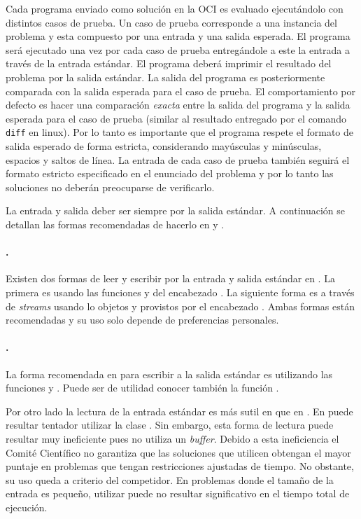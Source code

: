 Cada programa enviado como solución en la OCI es evaluado ejecutándolo con
distintos casos de prueba.
Un caso de prueba corresponde a una instancia del problema y esta compuesto por
una entrada y una salida esperada.
El programa será ejecutado una vez por cada caso de prueba entregándole a este
la entrada a través de la entrada estándar.
El programa deberá imprimir el resultado del problema por la salida estándar.
La salida del programa es posteriormente comparada con la salida esperada para
el caso de prueba.
El comportamiento por defecto es hacer una comparación \textit{exacta} entre la
salida del programa y la salida esperada para el caso de prueba (similar al
resultado entregado por el comando \verb|diff| en linux).
Por lo tanto es importante que el programa respete el formato de salida esperado
de forma estricta, considerando mayúsculas y minúsculas, espacios y saltos de
línea.
La entrada de cada caso de prueba también seguirá el formato estricto
especificado en el enunciado del problema y por lo tanto las soluciones no
deberán preocuparse de verificarlo.

La entrada y salida deber ser siempre por la salida estándar.
A continuación se detallan las formas recomendadas de hacerlo en \java y \cpp.
\paragraph{\cpp.} Existen dos formas de leer y escribir por la entrada y salida
  estándar en \cpp.
  La primera es usando las funciones  y  del encabezado
  .
  La siguiente forma es a través de \textit{streams} usando lo objetos
   y  provistos por el encabezado .
  Ambas formas están recomendadas y su uso solo depende de preferencias personales.
\paragraph{\java.} La forma recomendada en \java para escribir a la salida estándar es
  utilizando las funciones  y .
  Puede ser de utilidad conocer también la función .

  Por otro lado la lectura de la entrada estándar es más sutil en \java que en
  \cpp.
  En \java puede resultar tentador utilizar la clase .
  Sin embargo, esta forma de lectura puede resultar muy ineficiente pues no
  utiliza un \textit{buffer}.
  Debido a esta ineficiencia el Comité Científico no garantiza que las
  soluciones que utilicen  obtengan el mayor puntaje en problemas
  que tengan restricciones ajustadas de tiempo.
  No obstante, su uso queda a criterio del competidor.
  En problemas donde el tamaño de la entrada es pequeño, utilizar 
  puede no resultar significativo en el tiempo total de ejecución.

